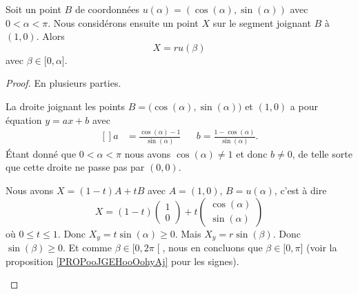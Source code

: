 


\begin{proposition}	\label{PROPooBXAZooNpGjjJ}
	Soit un point \( B\) de coordonnées \( u(\alpha)=(\cos(\alpha), \sin(\alpha))\) avec \(0< \alpha <\pi\). Nous considérons ensuite un point \( X\) sur le segment joignant \( B\) à \( (1,0)\). Alors
	\begin{equation}
		X=ru(\beta)
	\end{equation}
	avec \( \beta\in \mathopen[ 0,\alpha\mathclose]\).
\end{proposition}

\begin{proof}
	En plusieurs parties.
	\begin{subproof}
		\spitem[\( X\neq (0,0)\)]
		La droite joignant les points \( B=\big( \cos(\alpha),\sin(\alpha) \big)\) et \( (1,0)\) a pour équation \( y=ax+b\) avec
		\begin{equation}
			\begin{aligned}[]
				a & =\frac{ \cos(\alpha)-1 }{ \sin(\alpha) } &  & b  =\frac{ 1-\cos(\alpha) }{ \sin(\alpha) }.
			\end{aligned}
		\end{equation}
		Étant donné que \( 0<\alpha<\pi\) nous avons \( \cos(\alpha)\neq 1\) et donc \( b\neq 0\), de telle sorte que cette droite ne passe pas par \( (0,0)\).

		Nous avons \( X=(1-t)A+tB\) avec \( A=(1,0)\), \( B=u(\alpha)\), c'est à dire
		\begin{equation}		\label{EQooJTXOooDfQxjv}
			X=(1-t)\begin{pmatrix}
				1 \\
				0
			\end{pmatrix}+t\begin{pmatrix}
				\cos(\alpha) \\
				\sin(\alpha)
			\end{pmatrix}
		\end{equation}
		où \( 0\leq t\leq 1\). Donc \( X_y=t\sin(\alpha)\geq 0\). Mais \( X_y=r\sin(\beta)\). Donc \( \sin(\beta)\geq 0\). Et comme \( \beta\in\mathopen[ 0,2\pi\mathclose[\), nous en concluons que \( \beta\in\mathopen[ 0,\pi\mathclose]\) (voir la proposition \ref{PROPooJGEHooOohyAj} pour les signes).


\end{subproof}
\end{proof}
